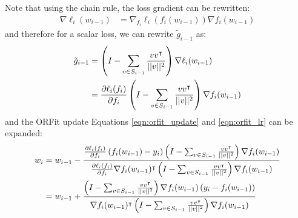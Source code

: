 Note that using the chain rule, the loss gradient can be rewritten:
\begin{align}
    \nabla \ell_i(w_{i-1}) &= \nabla_{f_i} \ell_i(f_i(w_{i-1})) \nabla f_i(w_{i-1})
\end{align}
and therefore for a scalar loss, we can rewrite $\tilde{g}_{i-1}$ as:
\begin{align}
    \tilde{g}_{i-1} &=  \left( I - \sum_{v \in S_{i-1}} \frac{v v^{\intercal}}{||v||^2} \right) \nabla \ell_i(w_{i-1}) \\
    &= \frac{\partial \ell_i(f_i)}{\partial f_i} \left( I - \sum_{v \in S_{i-1}} \frac{v v^{\intercal}}{||v||^2} \right) \nabla f_i(w_{i-1})
\end{align}
and the ORFit update Equations \ref{eqn:orfit_update} and \ref{eqn:orfit_lr} can be expanded:
\begin{align}
    w_i &= w_{i-1} - \frac{ \frac{\partial \ell_i(f_i)}{\partial f_i} 
    \left(f_i(w_{i-1}) - y_i \right) 
    \left( I - \sum_{v \in S_{i-1}} \frac{v v^{\intercal}}{||v||^2} \right) 
    \nabla f_i(w_{i-1}) }{
    \frac{\partial \ell_i(f_i)}{\partial f_i}
    \nabla f_i(w_{i-1})^{\intercal} \left( I - \sum_{v \in S_{i-1}} \frac{v v^{\intercal}}{||v||^2} \right) \nabla f_i(w_{i-1})} \\
    &= w_{i-1} + \frac{\left( I - \sum_{v \in S_{i-1}} \frac{v v^{\intercal}}{||v||^2} \right) \nabla f_i(w_{i-1})
    \left(y_i - f_i(w_{i-1})\right) }{
    \nabla f_i(w_{i-1})^{\intercal} \left( I - \sum_{v \in S_{i-1}} \frac{v v^{\intercal}}{||v||^2} \right) \nabla f_i(w_{i-1})} \label{eqn:orfit_bayesian}
\end{align}

